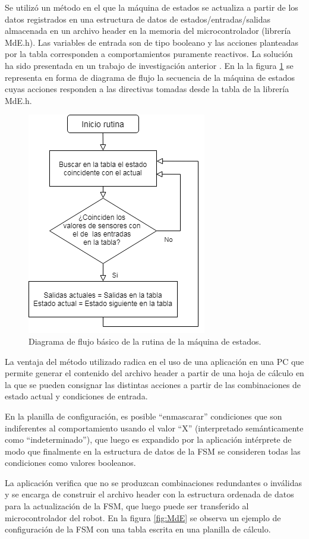 Se utilizó un método en el que la máquina de estados se actualiza a partir de los datos registrados en  una estructura de datos de estados/entradas/salidas almacenada en un archivo header en la memoria del microcontrolador (librería MdE.h). Las variables de entrada son de tipo booleano y las acciones planteadas por la tabla corresponden a comportamientos puramente reactivos. La solución ha sido presentada en un trabajo de investigación anterior \citep{planilla}. En la la figura \ref{fig:flujo} se representa en forma de diagrama de flujo la secuencia de la máquina de estados cuyas acciones responden a las directivas tomadas desde la tabla de la librería MdE.h.


\begin{figure}[h]
	\centering
	\includegraphics[width=7
	cm]{./Figures/flujo.png}
	\caption{Diagrama de flujo básico de la rutina de la máquina de estados.}
	\label{fig:flujo}
\end{figure}


La ventaja del método utilizado radica en el uso de una aplicación en una PC que permite generar el contenido del archivo header a partir de una hoja de cálculo en la que se pueden consignar las distintas acciones a partir de las combinaciones de estado actual y condiciones de entrada. 


En la planilla de configuración, es posible “enmascarar” condiciones que son indiferentes al comportamiento  usando el valor “X” (interpretado semánticamente como “indeterminado”), que luego es expandido por la aplicación intérprete de modo que finalmente en la estructura de datos de la FSM se consideren todas las condiciones como valores booleanos. 

La aplicación verifica que no se produzcan combinaciones redundantes o inválidas y se encarga de construir el archivo header con la estructura ordenada de datos para la actualización de la FSM, que luego puede ser transferido al microcontrolador del robot.
En la figura \ref{fig:MdE} se observa un ejemplo de configuración de la FSM con una tabla escrita en una planilla de cálculo.



